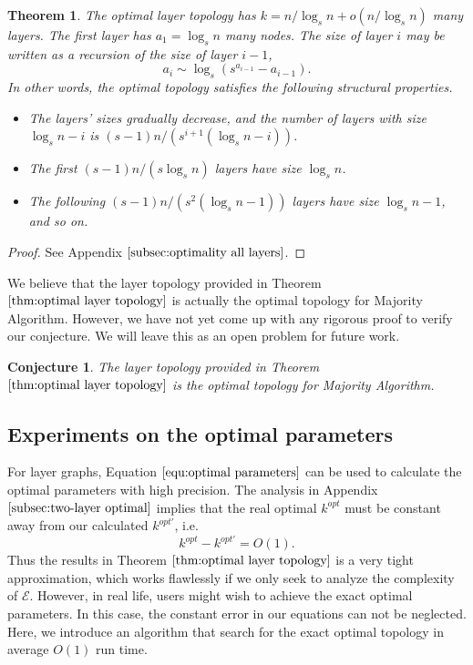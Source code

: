 \documentclass[a4paper,UKenglish]{lipics}
\newtheorem{thm}{Theorem}[section] %
\newtheorem{cjt}{Conjecture}
\theoremstyle{definition}
\begin{document}
\begin{thm}
\label{thm:optimal layer topology}
The optimal layer topology has $k = n/\log_s n + o(n/\log_s n)$ many layers.
The first layer has $a_1 = \log_{s}n$ many nodes.
The size of layer $i$ may be written as a recursion of the size of layer $i-1$,
\begin{equation}
\label{equ:optimal parameters}
	a_i
	\sim
	\log_s(s^{a_{i-1}}-a_{i-1}).
\end{equation}
In other words, the optimal topology satisfies the following structural properties.
\begin{itemize}
\item The layers' sizes gradually decrease, and the number of layers with size $\log_s n - i$ is ${(s-1)n / (s^{i+1}(\log_{s}n - i))}$. 
\item The first ${(s-1)n / (s\log_{s}n)}$ layers have size $\log_{s} n$.
\item The following ${(s-1)n / (s^{2}(\log_{s}n - 1))}$ layers have size $\log_s n - 1$, and so on.
\end{itemize}
\end{thm}

\begin{proof}
See Appendix $\ref{subsec:optimality all layers}$.
\end{proof}

We believe that the layer topology provided in Theorem $\ref{thm:optimal layer topology}$ is
	actually the optimal topology for Majority Algorithm.
However, we have not yet come up with any rigorous proof to verify our conjecture. 
We will leave this as an open problem for future work.
\begin{cjt}
\label{cjt:open problems}
The layer topology provided in Theorem $\ref{thm:optimal layer topology}$ is
	the optimal topology for Majority Algorithm.
\end{cjt}



\subsection {Experiments on the optimal parameters}

For layer graphs, Equation $\eqref{equ:optimal parameters}$ can be used to calculate the optimal parameters with high precision. 
The analysis in Appendix $\ref{subsec:two-layer optimal}$ implies that the real optimal $k^{opt}$ must be constant away from our calculated $k^{opt'}$, i.e.
\begin{equation*}
	k^{opt} - k^{opt'} 
= 
	O(1).
\end{equation*}
Thus the results in Theorem $\ref{thm:optimal layer topology}$ is a very tight approximation, which works flawlessly 
	if we only seek to analyze the complexity of $\mathcal{E}$. 
However, in real life, users might wish to achieve the exact optimal parameters. 
In this case, the constant error in our equations can not be neglected. 
Here, we introduce an algorithm that search for the exact optimal topology in average $O(1)$ run time.
\end{document}
